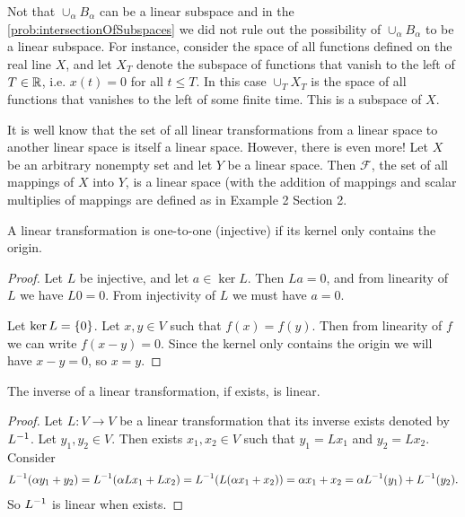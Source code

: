 \begin{summary}
	Not that $ \cup_\alpha B_\alpha $ can be a linear subspace and in the \autoref{prob:intersectionOfSubspaces} we did not rule out the possibility of $ \cup_\alpha B_\alpha $ to be a linear subspace. For instance, consider the space of all functions defined on the real line $ X $, and let $ X_T $ denote the subspace of functions that vanish to the left of $ T\in\mathbb{R} $, i.e. $ x(t) = 0 $ for all $ t\leq T $. In this case $ \cup_T X_T $ is the space of all functions that vanishes to the left of some finite time. This is a subspace of $ X $.
\end{summary}


\begin{summary}
	It is well know that the set of all linear transformations from a linear space to another linear space is itself a linear space. However, there is even more! Let $ X $ be an arbitrary nonempty set and let $ Y $  be a linear space. Then $ \mathcal{F} $, the set of all mappings of $ X $ into $ Y $, is a linear space (with the addition of mappings and scalar multiplies of mappings are defined as in Example 2 Section 2. 
\end{summary}


\begin{summary}
	A linear transformation is one-to-one (injective) if its kernel only contains the origin.
	\begin{proof}
		Let $ L $ be injective, and let $ a\in \ker L $. Then $ La = 0 $, and from linearity of $ L $ we have $ L0 = 0 $. From injectivity of $ L $ we must have $ a =0  $.
		
		Let $ \ker L = \{0\} $. Let $ x,y\in V $ such that $ f(x) = f(y) $. Then from linearity of $ f $ we can write $ f(x-y) = 0 $. Since the kernel only contains the origin we will have $ x-y= 0 $, so $ x= y $.
	\end{proof}
\end{summary}

\begin{summary}
	The inverse of a linear transformation, if exists, is linear. 
	\begin{proof}
		Let $ L:V\to V $ be a linear transformation that its inverse exists denoted by $ L^{-1} $. Let $ y_1,y_2 \in V $. Then exists $ x_1,x_2\in V $ such that $ y_1 = Lx_1 $ and $ y_2 = Lx_2 $. Consider
		\begin{align*}
			L^{-1}(\alpha y_1 + y_2) = L^{-1}(\alpha Lx_1+ Lx_2) = L^{-1}(L(\alpha x_1+x_2)) = \alpha x_1 + x_2  = \alpha L^{-1}(y_1) + L^{-1}(y_2).
		\end{align*}
		So $ L^{-1} $ is linear when exists.
	\end{proof}
\end{summary}



